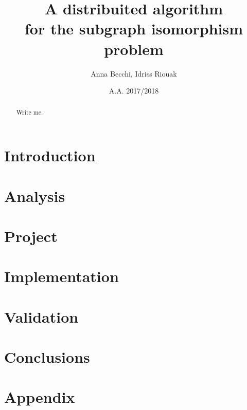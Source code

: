 \documentclass{memoir}
\title{A distribuited algorithm\\for the subgraph isomorphism problem}
\author{Anna Becchi, Idriss Riouak}
\date{A.A. 2017/2018}
\begin{document}
\maketitle
\begin{abstract}
Write me.
\end{abstract}

\chapter{Introduction}
\label{ch:intro}


\chapter{Analysis}
\label{ch:analysis}



\chapter{Project}
\label{ch:project}


\chapter{Implementation}
\label{ch:impl}


\chapter{Validation}
\label{ch:validation}


\chapter{Conclusions}
\label{ch:conclusions}


\appendix

\chapter{Appendix}
\label{ch:appendix}

\end{document}
